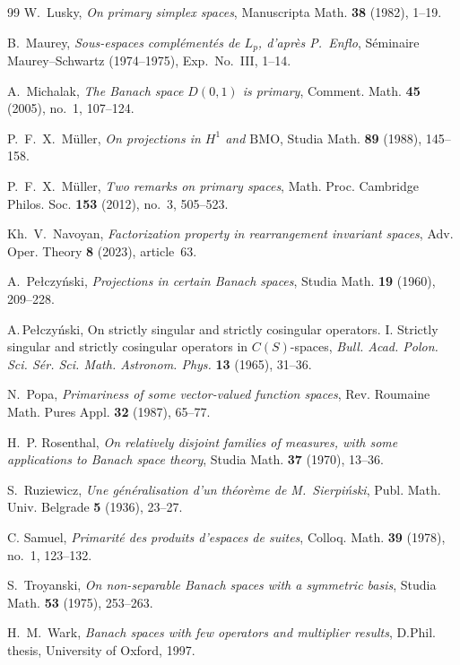 \documentclass[11pt]{amsart}
\theoremstyle{plain}
\theoremstyle{definition}
\numberwithin{equation}{section}
\begin{document}
\begin{thebibliography}{99}
W.~Lusky,
\emph{On primary simplex spaces},
Manuscripta Math. \textbf{38} (1982), 1--19.

B.~Maurey,
\emph{Sous-espaces compl\'ement\'es de $L_p$, d'apr\`es P.~Enflo},
S\'eminaire Maurey--Schwartz (1974--1975), Exp.~No.~III, 1--14.


A.~Michalak,
\emph{The Banach space $D(0,1)$ is primary},
Comment. Math. \textbf{45} (2005), no.~1, 107--124.

P.~F.~X.~M\"uller,
\emph{On projections in $H^1$ and $\mathrm{BMO}$},
Studia Math. \textbf{89} (1988), 145--158.

P.~F.~X.~M\"uller,
\emph{Two remarks on primary spaces},
Math. Proc. Cambridge Philos. Soc. \textbf{153} (2012), no.~3, 505--523.

Kh.~V.~Navoyan,
\emph{Factorization property in rearrangement invariant spaces},
Adv. Oper. Theory \textbf{8} (2023), article~63.

A.~Pe{\l}czy\'nski,
\emph{Projections in certain Banach spaces},
Studia Math. \textbf{19} (1960), 209--228.

 {A.\,Pe{\l}czy{\'n}ski}, On strictly singular and strictly cosingular operators. I. Strictly singular and strictly cosingular operators in $C(S)$-spaces, \emph{Bull. Acad. Polon. Sci. S{\'e}r. Sci. Math. Astronom. Phys.} {\bf 13} (1965), 31--36.

N.~Popa,
\emph{Primariness of some vector-valued function spaces},
Rev. Roumaine Math. Pures Appl. \textbf{32} (1987), 65--77.

H.~P. Rosenthal,
\emph{On relatively disjoint families of measures, with some applications to Banach space theory},
Studia Math. \textbf{37} (1970), 13--36.

S.~Ruziewicz,
\emph{Une g\'en\'eralisation d'un th\'eor\`eme de M.~Sierpi\'nski},
Publ. Math. Univ. Belgrade \textbf{5} (1936), 23--27.

C. Samuel,
\emph{Primarité des produits d'espaces de suites},
Colloq. Math. \textbf{39} (1978), no.~1, 123--132.

S.~Troyanski,
\emph{On non-separable Banach spaces with a symmetric basis},
Studia Math. \textbf{53} (1975), 253--263.

H.~M.~Wark,
\emph{Banach spaces with few operators and multiplier results},
D.Phil. thesis, University of Oxford, 1997.


\end{thebibliography}
\end{document}
